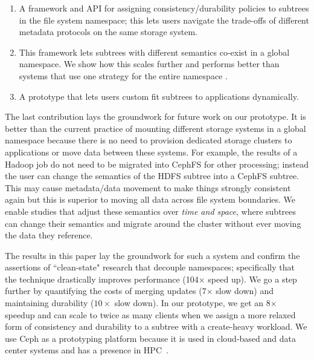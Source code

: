 \begin{enumerate}

  \item A framework and API for assigning consistency/durability policies 
  to subtrees in the file system namespace; this lets users navigate
  the trade-offs of different metadata protocols on the same storage system.

  \item This framework lets subtrees with different semantics co-exist in a
  global namespace. We show how this scales further and performs better than
  systems that use one strategy for the entire namespace .

  \item A prototype that lets users custom fit subtrees to applications
  dynamically. 

\end{enumerate}

The last contribution lays the groundwork for future work on our prototype. It
is better than the current practice of mounting different storage systems in a global
namespace because there is no need to provision dedicated storage clusters to
applications or move data between these systems.  For example, the results of a
Hadoop job do not need to be migrated into CephFS for other processing; instead
the user can change the semantics of the HDFS subtree into a CephFS subtree.
This may cause metadata/data movement to make things strongly consistent again
but this is superior to moving all data across file system boundaries. We
enable studies that adjust these semantics over {\it time and space}, where
subtrees can change their semantics and migrate around the cluster without ever
moving the data they reference.

The results in this paper lay the groundwork for such a system and confirm the
assertions of ``clean-state" research that decouple namespaces; specifically
that the technique drastically improves performance (104\(\times\) speed up).
We go a step further by quantifying the costs of merging updates (7\(\times\)
slow down) and maintaining durability (\(10\times\) slow down). In our
prototype, we get an 8\(\times\) speedup and can scale to twice as many clients
when we assign a more relaxed form of consistency and durability to a subtree
with a create-heavy workload.  We use Ceph as a prototyping platform because it
is used in cloud-based and data center systems and has a presence in
HPC~\cite{wang:pdsw13-ceph-hpc}. 


